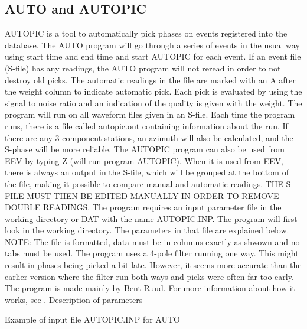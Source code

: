 
\subsection{AUTO and AUTOPIC}

AUTOPIC is a tool to automatically pick phases
on events registered into the database. 
The AUTO program will go through a series of events in the usual way using start time and end time and start AUTOPIC for each event.
If an event file (S-file) has any readings, the AUTO program will not reread in order to not destroy old picks. The automatic readings in the file are marked with an A after the weight column to indicate automatic pick. Each pick is evaluated by using the signal to noise ratio and an indication of the quality is given with the weight. The program will run on all waveform files given in an S-file. Each time the program runs, there is a file called autopic.out containing information about the run. 
If there are any 3-component stations, an azimuth will also be calculated, and the S-phase will be more reliable. 
The AUTOPIC program  can also be used from EEV by typing Z (will run program AUTOPIC). When it is used from EEV, there is always an output in the S-file, which will be grouped at the bottom of the file, making it possible to compare manual and automatic readings. THE S-FILE MUST THEN BE EDITED MANUALLY IN ORDER TO REMOVE DOUBLE READINGS. 
The program requires an input parameter file in the working directory or DAT with the name AUTOPIC.INP. The program will first look in the working directory. The parameters in that file are explained below. NOTE: The file is formatted, data must be in columns exactly as shwown and no tabs must be used.   
The program uses a 4-pole filter running one way. This might result in phases being picked a bit late. However, it seems more accurate than the earlier version where the filter run both ways and picks were often far too early. 
The program is made mainly by Bent Ruud. For more information about how it works, see \citet{ruud1988,ruud1992}. 
Description of parameters 



Example of input file AUTOPIC.INP for AUTO 

%


